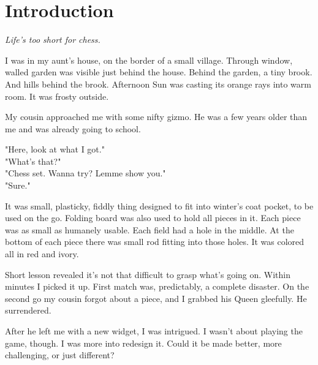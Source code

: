 

\chapter*{Introduction}
\label{ch:Introduction}

\begin{flushright}
\parbox{0.6\textwidth}{
\emph{Life's too short for chess. \\
 } }
\end{flushright}

\noindent
I was in my aunt's house, on the border of a small village.
Through window, walled garden was visible just behind the house.
Behind the garden, a tiny brook. And hills behind the brook.
Afternoon Sun was casting its orange rays into warm room. It
was frosty outside.

My cousin approached me with some nifty gizmo. He was a
few years older than me and was already going to school.

\noindent
"Here, look at what I got." \\
\hspace*{\fill}"What's that?" \\
"Chess set. Wanna try? Lemme show you." \\
\hspace*{\fill}"Sure."

It was small, plasticky, fiddly thing designed to fit into winter's
coat pocket, to be used on the go. Folding board was also used to
hold all pieces in it. Each piece was as small as humanely usable.
Each field had a hole in the middle. At the bottom of each piece
there was small rod fitting into those holes. It was colored all
in red and ivory.

Short lesson revealed it's not that difficult to grasp what's going
on. Within minutes I picked it up. First match was, predictably, a
complete disaster. On the second go my cousin forgot about a piece,
and I grabbed his Queen gleefully. He surrendered.

After he left me with a new widget, I was intrigued. I wasn't
about playing the game, though. I was more into redesign it. Could it
be made better, more challenging, or just different?

